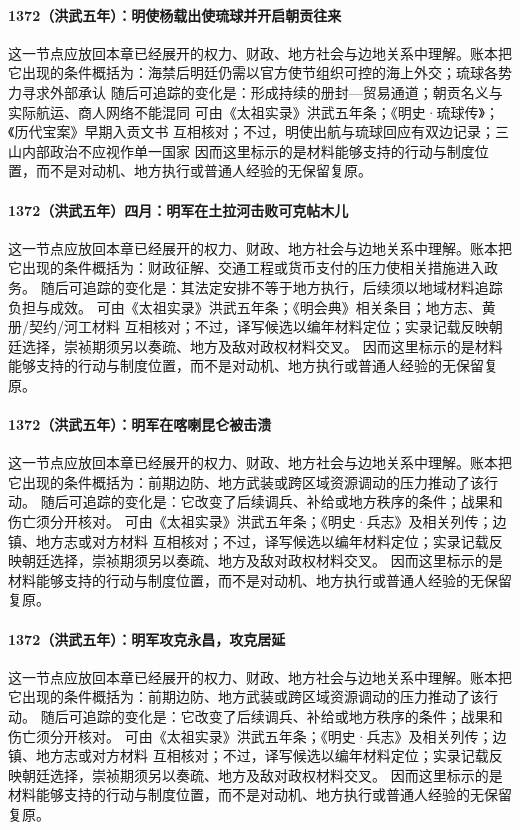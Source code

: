 \paragraph{1372（洪武五年）：明使杨载出使琉球并开启朝贡往来} 这一节点应放回本章已经展开的权力、财政、地方社会与边地关系中理解。账本把它出现的条件概括为：海禁后明廷仍需以官方使节组织可控的海上外交；琉球各势力寻求外部承认 随后可追踪的变化是：形成持续的册封—贸易通道；朝贡名义与实际航运、商人网络不能混同 可由《太祖实录》洪武五年条；《明史·琉球传》；《历代宝案》早期入贡文书 互相核对；不过，明使出航与琉球回应有双边记录；三山内部政治不应视作单一国家 因而这里标示的是材料能够支持的行动与制度位置，而不是对动机、地方执行或普通人经验的无保留复原。

\paragraph{1372（洪武五年）四月：明军在土拉河击败可克帖木儿} 这一节点应放回本章已经展开的权力、财政、地方社会与边地关系中理解。账本把它出现的条件概括为：财政征解、交通工程或货币支付的压力使相关措施进入政务。 随后可追踪的变化是：其法定安排不等于地方执行，后续须以地域材料追踪负担与成效。 可由《太祖实录》洪武五年条；《明会典》相关条目；地方志、黄册/契约/河工材料 互相核对；不过，译写候选以编年材料定位；实录记载反映朝廷选择，崇祯期须另以奏疏、地方及敌对政权材料交叉。 因而这里标示的是材料能够支持的行动与制度位置，而不是对动机、地方执行或普通人经验的无保留复原。

\paragraph{1372（洪武五年）：明军在喀喇昆仑被击溃} 这一节点应放回本章已经展开的权力、财政、地方社会与边地关系中理解。账本把它出现的条件概括为：前期边防、地方武装或跨区域资源调动的压力推动了该行动。 随后可追踪的变化是：它改变了后续调兵、补给或地方秩序的条件；战果和伤亡须分开核对。 可由《太祖实录》洪武五年条；《明史·兵志》及相关列传；边镇、地方志或对方材料 互相核对；不过，译写候选以编年材料定位；实录记载反映朝廷选择，崇祯期须另以奏疏、地方及敌对政权材料交叉。 因而这里标示的是材料能够支持的行动与制度位置，而不是对动机、地方执行或普通人经验的无保留复原。

\paragraph{1372（洪武五年）：明军攻克永昌，攻克居延} 这一节点应放回本章已经展开的权力、财政、地方社会与边地关系中理解。账本把它出现的条件概括为：前期边防、地方武装或跨区域资源调动的压力推动了该行动。 随后可追踪的变化是：它改变了后续调兵、补给或地方秩序的条件；战果和伤亡须分开核对。 可由《太祖实录》洪武五年条；《明史·兵志》及相关列传；边镇、地方志或对方材料 互相核对；不过，译写候选以编年材料定位；实录记载反映朝廷选择，崇祯期须另以奏疏、地方及敌对政权材料交叉。 因而这里标示的是材料能够支持的行动与制度位置，而不是对动机、地方执行或普通人经验的无保留复原。

